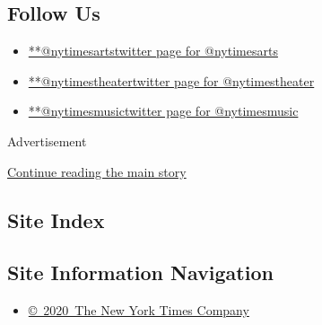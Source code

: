 \hypertarget{follow-us}{%
\subsection{Follow Us}\label{follow-us}}

\begin{itemize}
\tightlist
\item
  \href{https://twitter.com/nytimesarts}{**@nytimesartstwitter page for
  @nytimesarts}
\item
  \href{https://twitter.com/nytimestheater}{**@nytimestheatertwitter
  page for @nytimestheater}
\item
  \href{https://twitter.com/nytimesmusic}{**@nytimesmusictwitter page
  for @nytimesmusic}
\end{itemize}

Advertisement

\protect\hyperlink{after-mktg}{Continue reading the main story}

\hypertarget{site-index}{%
\subsection{Site Index}\label{site-index}}

\hypertarget{site-information-navigation}{%
\subsection{Site Information
Navigation}\label{site-information-navigation}}

\begin{itemize}
\tightlist
\item
  \href{https://help.nytimes3xbfgragh.onion/hc/en-us/articles/115014792127-Copyright-notice}{©~2020~The
  New York Times Company}
\end{itemize}

